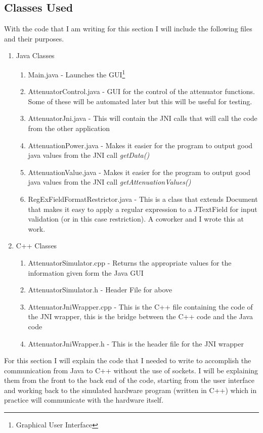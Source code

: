 \documentclass [a4paper,12pt,oneside,final,titlepage]{article}
\begin{document}
	\subsection{Classes Used}
	With the code that I am writing for this section I will include the following files and their purposes.
	\begin{enumerate}
		\item Java Classes
			\begin{enumerate}
				\item Main.java - Launches the GUI\footnote{Graphical User Interface}
				\item AttenuatorControl.java - GUI for the control of the attenuator functions. Some of these will be automated later but this will be useful for testing.
				\item AttenuatorJni.java - This will contain the JNI calls that will call the code from the other application
				\item AttenuationPower.java - Makes it easier for the program to output good java values from the JNI call \emph{getData()}
				\item AttenuationValue.java - Makes it easier for the program to output good java values from the JNI call \emph{getAttenuationValues()}
				\item RegExFieldFormatRestrictor.java - This is a class that extends Document that makes it easy to apply a regular expression to a JTextField for input validation (or in this case restriction). A coworker and I wrote this at work.
			\end{enumerate}
		\item C++ Classes
			\begin{enumerate}
				\item AttenuatorSimulator.cpp -  Returns the appropriate values for the information given form the Java GUI
				\item AttenuatorSimulator.h -  Header File for above
				\item AttenuatorJniWrapper.cpp - This is the C++ file containing the code of the JNI wrapper, this is the bridge between the C++ code and the Java code
				\item AttenuatorJniWrapper.h - This is the header file for the JNI wrapper 
			\end{enumerate}
	\end{enumerate}
	
	
	For this section I will explain the code that I needed to write to accomplish the communication from Java to C++ without the use of sockets. I will be explaining them from the front to the back end of the code, starting from the user interface and working back to the simulated hardware program (written in C++) which in practice will communicate with the hardware itself.
\end{document}

